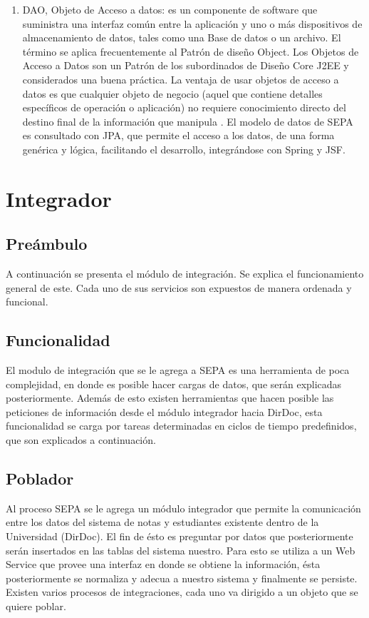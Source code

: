 \documentclass[a4paper,12pt,openany,oneside]{book}
\begin{document}
\begin{enumerate}
\item DAO, Objeto de Acceso a datos: es un componente de software que suministra una interfaz común entre la aplicación y uno o más dispositivos de almacenamiento de datos, tales como una Base de datos o un archivo. El término se aplica frecuentemente al Patrón de diseño Object. Los Objetos de Acceso a Datos son un Patrón de los subordinados de Diseño Core J2EE y considerados una buena práctica. La ventaja de usar objetos de acceso a datos es que cualquier objeto de negocio (aquel que contiene detalles específicos de operación o aplicación) no requiere conocimiento directo del destino final de la información que manipula \cite{data25}. El modelo de datos de SEPA es consultado con JPA, que permite el acceso a los datos, de una forma genérica y lógica, facilitando el desarrollo, integrándose con Spring y JSF.

\end{enumerate}

\chapter{Integrador}
\thispagestyle{empty}

\section{Preámbulo}
A continuación se presenta el módulo de integración. Se explica el funcionamiento general de este. Cada uno de sus servicios son expuestos de manera ordenada y funcional.

\section{Funcionalidad}

El modulo de integración que se le agrega a SEPA es una herramienta de poca complejidad, en donde es posible hacer cargas de datos, que serán explicadas posteriormente. Además de esto existen herramientas que hacen posible las peticiones de información desde el módulo integrador hacia DirDoc, esta funcionalidad se carga por tareas determinadas en ciclos de tiempo predefinidos, que son explicados a continuación.

\section{Poblador}
Al proceso SEPA se le agrega un módulo integrador que permite la comunicación entre los datos del sistema de notas y estudiantes existente dentro de la Universidad (DirDoc). El fin de ésto es preguntar por datos que posteriormente serán insertados en las tablas del sistema nuestro. Para esto se utiliza a un Web Service que provee una interfaz en donde se obtiene la información, ésta posteriormente se normaliza y adecua a nuestro sistema y finalmente se persiste. Existen varios procesos de integraciones, cada uno va dirigido a un objeto que se quiere poblar.
\end{document}

